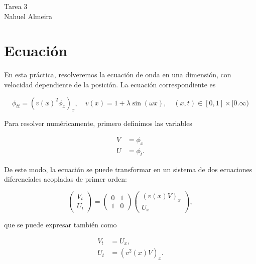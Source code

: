\documentclass[12pt]{article}
\begin{document}

\graphicspath{{figures/}}

\begin{center}
    \Large     Tarea 3 \\
    Nahuel Almeira
    \normalsize
\end{center}

\section{Ecuaci\'on}

En esta pr\'actica, resolveremos la ecuaci\'on de onda en una dimensi\'on, con velocidad dependiente de la posici\'on. La ecuaci\'on correspondiente es 

\begin{equation}
\phi_{tt} = (v(x)^2\phi_x)_x, \quad v(x) = 1 + \lambda \sin(\omega x),\quad (x,t) \in [0,1]\times [0.\infty)
\end{equation}

Para resolver num\'ericamente, primero definimos las variables

\begin{align}
V &= \phi_x\\
U &= \phi_t.
\end{align}

De este modo, la ecuaci\'on se puede transformar en un sistema de dos ecuaciones diferenciales acopladas de primer orden:

\begin{equation}
\begin{pmatrix}
V_t \\
U_t
\end{pmatrix} = 
\begin{pmatrix}
0 & 1 \\
1 & 0
\end{pmatrix}
\begin{pmatrix}
(v(x) V)_x \\
U_x
\end{pmatrix},
\end{equation}

que se puede expresar tambi\'en como

\begin{align}
V_t &= U_x, \\
U_t &= (v^2(x) V)_x .
\end{align}
\end{document}
